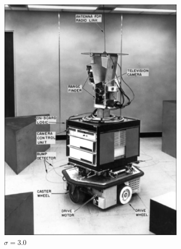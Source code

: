 \documentclass[lettersize,journal]{IEEEtran}
\begin{document}
\begin{figure}[h]
\begin{subfigure}[h]{0.115\textwidth}
        \includegraphics[width=\linewidth]{gaussian_map_5x5_sigma_3}
        \caption{$\sigma=3.0$}  
    \end{subfigure}
    \begin{subfigure}[h]{0.115\textwidth}
        \centering 

\end{subfigure}
\end{figure}
\end{document}
